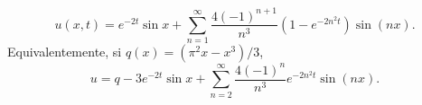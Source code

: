 \[u(x,t)=e^{-2t}\sin x+\sum_{n=1}^{\infty}\frac{4(-1)^{n+1}}{n^3}(1-e^{-2n^2t})\sin(nx).\] Equivalentemente, si $q(x)=(\pi^2x-x^3)/3$, \[u=q-3e^{-2t}\sin x+\sum_{n=2}^{\infty}\frac{4(-1)^n}{n^3}e^{-2n^2t}\sin(nx).\]
